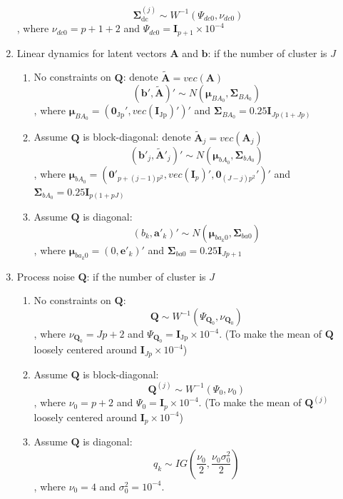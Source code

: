 \documentclass[]{article}
\begin{document}
\begin{enumerate}
	\[\mathbf{\Sigma}_{\text{dc}}^{(j)} \sim W^{- 1}\left( \Psi_{dc0},\nu_{dc0} \right)\]
	, where \(\nu_{dc0} = p + 1 + 2\) and
	\(\Psi_{dc0} = \mathbf{I}_{p + 1} \times 10^{-4}\)
	\item
	Linear dynamics for latent vectors \(\mathbf{A}\) and \(\mathbf{b}\): if the number of cluster is \(J\)
	\begin{enumerate}
		\def\labelenumi{\alph{enumi}.}
		\item
		No constraints on \(\mathbf{Q}\): denote \(\widetilde{\mathbf{A}} = vec(\mathbf{A})\)
		\[\left( \mathbf{b}',\widetilde{\mathbf{A}} \right)' \sim N\left( \bm{\mu}_{BA_{0}},\mathbf{\Sigma}_{BA_{0}} \right)\]
		, where \(\bm{\mu}_{BA_{0}} = \left( \mathbf{0}_{\text{Jp}}',vec\left( \mathbf{I}_{\text{Jp}} \right)' \right)'\)
		and \(\mathbf{\Sigma}_{BA_{0}} = 0.25\mathbf{I}_{Jp(1 + Jp)}\)
		\item
		Assume \(\mathbf{Q}\) is block-diagonal: denote
		\({\widetilde{\mathbf{A}}}_{j} = vec\left( \mathbf{A}_{j} \right)\)
		\[\left( \mathbf{b}'_{j}, {\widetilde{\mathbf{A}}}'_{j} \right)' \sim N\left( \bm{\mu}_{bA_{0}},\mathbf{\Sigma}_{bA_{0}} \right)\]
		, where \(\bm{\mu}_{bA_{0}} = \left( \mathbf{0}'_{p + (j - 1)p^{2}}, vec\left( \mathbf{I}_{p} \right)', \mathbf{0}_{(J - j)p^{2}}' \right)'\)
		and \(\mathbf{\Sigma}_{bA_{0}} = 0.25\mathbf{I}_{p(1 + pJ)}\)
		\item
		Assume \(\mathbf{Q}\) is diagonal:
		\[\left( b_{k},\mathbf{a}'_{k} \right)' \sim N\left( \mathbf{\mu}_{ba_{k}0},\mathbf{\Sigma}_{ba0} \right)\]
		, where \(\mathbf{\mu}_{ba_{k}0} = \left( 0,\mathbf{e}'_{k} \right)'\) and \(\mathbf{\Sigma}_{ba0} = 0.25\mathbf{I}_{Jp + 1}\)	
	\end{enumerate}
	\item
	Process noise \(\mathbf{Q}\): if the number of cluster is \(J\)
	\begin{enumerate}
		\def\labelenumi{\alph{enumi}.}
		\item
		No constraints on \(\mathbf{Q}\):
		\[\mathbf{Q} \sim W^{- 1}(\Psi_{\mathbf{Q}_{0}},\nu_{\mathbf{Q}_{0}})\]
		, where \(\nu_{\mathbf{Q}_{0}} = Jp + 2\) and
		\(\Psi_{\mathbf{Q}_{0}} = \mathbf{I}_{\text{Jp}} \times 10^{- 4}\). (To make the mean of \(\mathbf{Q}\) loosely centered around
		\(\mathbf{I}_{Jp} \times 10^{- 4}\))
		\item
		Assume \(\mathbf{Q}\) is block-diagonal:
		\[\mathbf{Q}^{(j)} \sim W^{- 1}\left( \Psi_{0},\nu_{0} \right)\]
		, where \(\nu_{0} = p + 2\) and
		\(\Psi_{0} = \mathbf{I}_{p} \times 10^{- 4}\). (To make the mean of \(\mathbf{Q}^{(j)}\) loosely centered around
		\(\mathbf{I}_{p} \times 10^{- 4}\))
		\item
		Assume \(\mathbf{Q}\) is diagonal:
		\[q_{k} \sim IG(\frac{\nu_{0}}{2},\frac{\nu_{0}\sigma_{0}^{2}}{2})\]
		, where \(\nu_{0} = 4\) and \(\sigma_{0}^{2} = 10^{- 4}\).
	\end{enumerate}
\end{enumerate}
\end{document}
